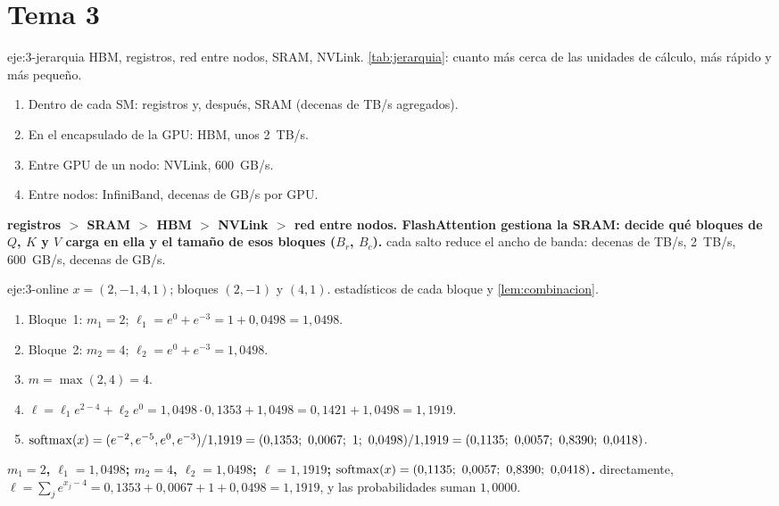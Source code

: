 \section{Tema 3}

\begin{solucion}{eje:3-jerarquia}
\datos HBM, registros, red entre nodos, SRAM, NVLink.
\planteamiento \cref{tab:jerarquia}: cuanto más cerca de las unidades de cálculo, más rápido y más pequeño.
\pasos
\begin{enumerate}[label=\arabic*.]
  \item Dentro de cada SM: registros y, después, SRAM (decenas de TB/s agregados).
  \item En el encapsulado de la GPU: HBM, unos 2~TB/s.
  \item Entre GPU de un nodo: NVLink, 600~GB/s.
  \item Entre nodos: InfiniBand, decenas de GB/s por GPU.
\end{enumerate}
\resultado \textbf{registros $>$ SRAM $>$ HBM $>$ NVLink $>$ red entre nodos. FlashAttention gestiona la SRAM: decide qué bloques de $Q$, $K$ y $V$ carga en ella y el tamaño de esos bloques ($B_r$, $B_c$).}
\comprobacion cada salto reduce el ancho de banda: decenas de TB/s, 2~TB/s, 600~GB/s, decenas de GB/s.
\end{solucion}

\begin{solucion}{eje:3-online}
\datos $x=(2,-1,4,1)$; bloques $(2,-1)$ y $(4,1)$.
\planteamiento estadísticos de cada bloque y \cref{lem:combinacion}.
\pasos
\begin{enumerate}[label=\arabic*.]
  \item Bloque~1: $m_1=2$; $\ell_1=e^{0}+e^{-3}=1+0{,}0498=1{,}0498$.
  \item Bloque~2: $m_2=4$; $\ell_2=e^{0}+e^{-3}=1{,}0498$.
  \item $m=\max(2,4)=4$.
  \item $\ell=\ell_1e^{2-4}+\ell_2e^{0}=1{,}0498\cdot 0{,}1353+1{,}0498=0{,}1421+1{,}0498=1{,}1919$.
  \item $\softmax(x)=(e^{-2},e^{-5},e^{0},e^{-3})/1{,}1919=(0{,}1353;\ 0{,}0067;\ 1;\ 0{,}0498)/1{,}1919=(0{,}1135;\ 0{,}0057;\ 0{,}8390;\ 0{,}0418)$.
\end{enumerate}
\resultado \textbf{$m_1=2$, $\ell_1=1{,}0498$; $m_2=4$, $\ell_2=1{,}0498$; $\ell=1{,}1919$; $\softmax(x)=(0{,}1135;\ 0{,}0057;\ 0{,}8390;\ 0{,}0418)$.}
\comprobacion directamente, $\ell=\sum_je^{x_j-4}=0{,}1353+0{,}0067+1+0{,}0498=1{,}1919$, y las probabilidades suman $1{,}0000$.
\end{solucion}

